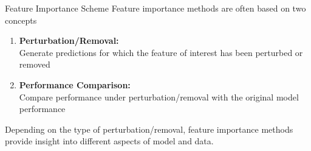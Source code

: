 \begin{vbframe}{Feature Importance Scheme}
Feature importance methods are often based on two concepts
\lz
\begin{enumerate}
  \item \textbf{Perturbation/Removal:}\\
  Generate predictions for which the feature of interest has been perturbed or removed
  \item \textbf{Performance Comparison:} \\
  Compare performance under perturbation/removal with the original model performance
\end{enumerate}
\lz
Depending on the type of perturbation/removal, feature importance methods provide insight into different aspects of model and data.
\end{vbframe}


